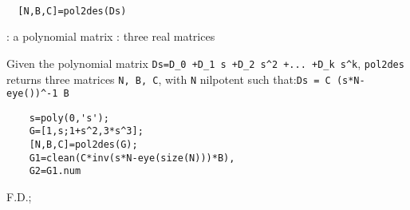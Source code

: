 
\begin{mandesc}
   \\
\end{mandesc}
\begin{calling_sequence}
\begin{verbatim}
  [N,B,C]=pol2des(Ds)  
\end{verbatim}
\end{calling_sequence}
\begin{parameters}
  \begin{varlist}
    : a polynomial matrix
    : three real matrices
  \end{varlist}
\end{parameters}
\begin{mandescription}
  Given the polynomial matrix \verb!Ds=D_0 +D_1 s +D_2 s^2 +... +D_k s^k!,
  \verb!pol2des! returns three  matrices \verb!N, B, C!, with \verb!N! nilpotent 
  such that:\verb!Ds = C (s*N-eye())^-1 B!
\end{mandescription}
\begin{examples}
  \begin{Verbatim}
    s=poly(0,'s');
    G=[1,s;1+s^2,3*s^3];
    [N,B,C]=pol2des(G);
    G1=clean(C*inv(s*N-eye(size(N)))*B),
    G2=G1.num
  \end{Verbatim}
\end{examples}
\begin{manseealso}
     
\end{manseealso}
\begin{authors}
  F.D.;   
\end{authors}
